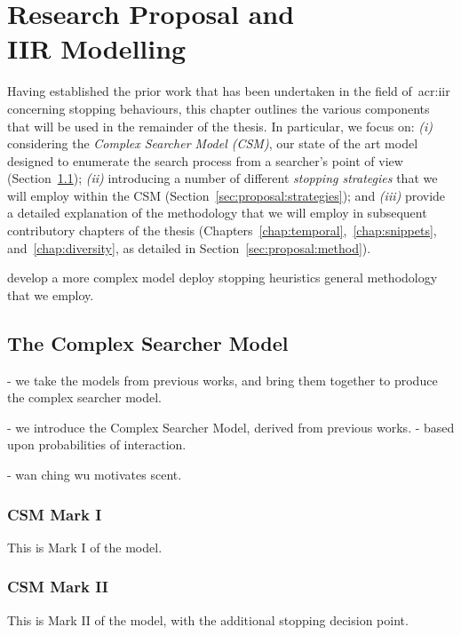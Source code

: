 
\chapter[Models and Proposal]{Research Proposal and\\IIR Modelling}\label{chap:proposal}
Having established the prior work that has been undertaken in the field of~\gls{acr:iir} concerning stopping behaviours, this chapter outlines the various components that will be used in the remainder of the thesis. In particular, we focus on: \emph{(i)} considering the \emph{Complex Searcher Model (CSM)}, our state of the art model designed to enumerate the search process from a searcher's point of view (Section~\ref{sec:proposal:csm}); \emph{(ii)} introducing a number of different \emph{stopping strategies} that we will employ within the CSM (Section~\ref{sec:proposal:strategies}); and \emph{(iii)} provide a detailed explanation of the methodology that we will employ in subsequent contributory chapters of the thesis (Chapters~\ref{chap:temporal},~\ref{chap:snippets}, and~\ref{chap:diversity}, as detailed in Section~\ref{sec:proposal:method}).

develop a more complex model
deploy stopping heuristics
general methodology that we employ.

\section{The Complex Searcher Model}\label{sec:proposal:csm}

- we take the models from previous works, and bring them together to produce the complex searcher model.

- we introduce the Complex Searcher Model, derived from previous works.
- based upon probabilities of interaction.

- wan ching wu motivates scent.

\subsection{CSM Mark I}
This is Mark I of the model.

\subsection{CSM Mark II}
This is Mark II of the model, with the additional stopping decision point.

